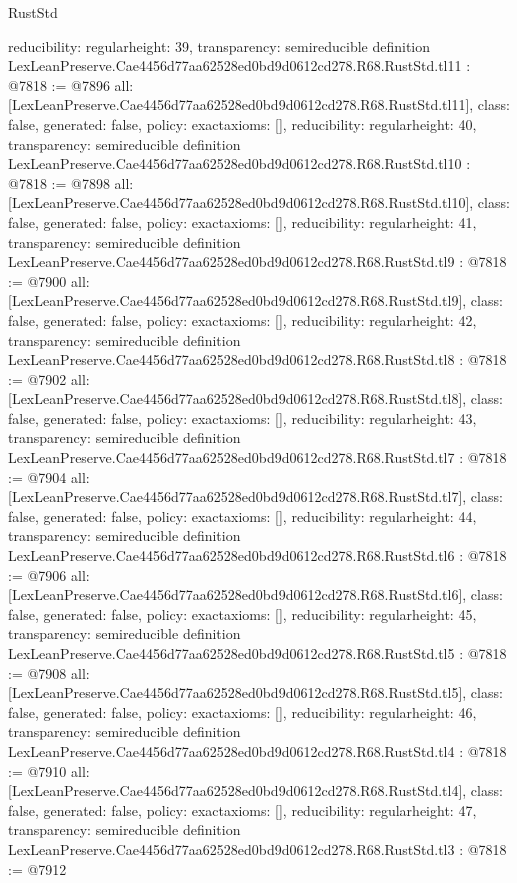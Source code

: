 \begin{lexlean}{RustStd}
\begin{coremodule}
{  reducibility: regular{height: 39},
  transparency: semireducible
}
definition LexLeanPreserve.Cae4456d77aa62528ed0bd9d0612cd278.R68.RustStd.tl11 : @7818 := @7896 {
  all: [LexLeanPreserve.Cae4456d77aa62528ed0bd9d0612cd278.R68.RustStd.tl11],
  class: false,
  generated: false,
  policy: exact{axioms: []},
  reducibility: regular{height: 40},
  transparency: semireducible
}
definition LexLeanPreserve.Cae4456d77aa62528ed0bd9d0612cd278.R68.RustStd.tl10 : @7818 := @7898 {
  all: [LexLeanPreserve.Cae4456d77aa62528ed0bd9d0612cd278.R68.RustStd.tl10],
  class: false,
  generated: false,
  policy: exact{axioms: []},
  reducibility: regular{height: 41},
  transparency: semireducible
}
definition LexLeanPreserve.Cae4456d77aa62528ed0bd9d0612cd278.R68.RustStd.tl9 : @7818 := @7900 {
  all: [LexLeanPreserve.Cae4456d77aa62528ed0bd9d0612cd278.R68.RustStd.tl9],
  class: false,
  generated: false,
  policy: exact{axioms: []},
  reducibility: regular{height: 42},
  transparency: semireducible
}
definition LexLeanPreserve.Cae4456d77aa62528ed0bd9d0612cd278.R68.RustStd.tl8 : @7818 := @7902 {
  all: [LexLeanPreserve.Cae4456d77aa62528ed0bd9d0612cd278.R68.RustStd.tl8],
  class: false,
  generated: false,
  policy: exact{axioms: []},
  reducibility: regular{height: 43},
  transparency: semireducible
}
definition LexLeanPreserve.Cae4456d77aa62528ed0bd9d0612cd278.R68.RustStd.tl7 : @7818 := @7904 {
  all: [LexLeanPreserve.Cae4456d77aa62528ed0bd9d0612cd278.R68.RustStd.tl7],
  class: false,
  generated: false,
  policy: exact{axioms: []},
  reducibility: regular{height: 44},
  transparency: semireducible
}
definition LexLeanPreserve.Cae4456d77aa62528ed0bd9d0612cd278.R68.RustStd.tl6 : @7818 := @7906 {
  all: [LexLeanPreserve.Cae4456d77aa62528ed0bd9d0612cd278.R68.RustStd.tl6],
  class: false,
  generated: false,
  policy: exact{axioms: []},
  reducibility: regular{height: 45},
  transparency: semireducible
}
definition LexLeanPreserve.Cae4456d77aa62528ed0bd9d0612cd278.R68.RustStd.tl5 : @7818 := @7908 {
  all: [LexLeanPreserve.Cae4456d77aa62528ed0bd9d0612cd278.R68.RustStd.tl5],
  class: false,
  generated: false,
  policy: exact{axioms: []},
  reducibility: regular{height: 46},
  transparency: semireducible
}
definition LexLeanPreserve.Cae4456d77aa62528ed0bd9d0612cd278.R68.RustStd.tl4 : @7818 := @7910 {
  all: [LexLeanPreserve.Cae4456d77aa62528ed0bd9d0612cd278.R68.RustStd.tl4],
  class: false,
  generated: false,
  policy: exact{axioms: []},
  reducibility: regular{height: 47},
  transparency: semireducible
}
definition LexLeanPreserve.Cae4456d77aa62528ed0bd9d0612cd278.R68.RustStd.tl3 : @7818 := @7912 {
}
\end{coremodule}
\end{lexlean}
